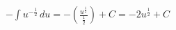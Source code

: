 \documentclass[preview]{standalone}
\begin{document}
\begin{align*}
-\int u^{-\frac{1}{2}} \, du = -\left( \frac{u^{\frac{1}{2}}}{\frac{1}{2}} \right) + C = -2u^{\frac{1}{2}} + C
\end{align*}
\end{document}
